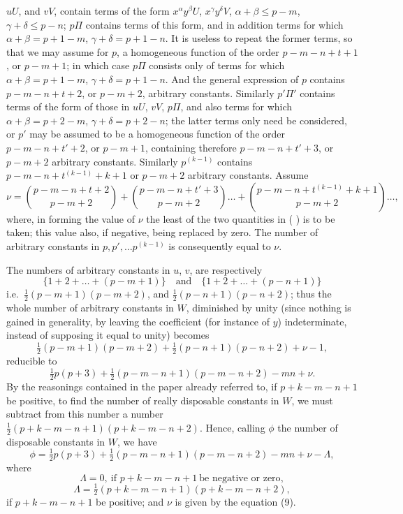 \documentclass[11pt]{article}
\begin{document}
$u U$, and $v V$, contain terms of the form $x^\alpha y^\beta U$, $x^\gamma y^\delta V$, $\alpha + \beta \leq p - m$, $\gamma + \delta \leq p - n$; $p\Pi$ contains terms of this form, and in addition terms for which $\alpha + \beta = p + 1 - m$, $\gamma + \delta = p + 1 - n$. It is useless to repeat the former terms, so that we may assume for $p$, a homogeneous function of the order $p - m - n + t + 1$, or $p - m + 1$; in which case $p\Pi$ consists only of terms for which $\alpha + \beta = p + 1 - m$, $\gamma + \delta = p + 1 - n$. And the general expression of $p$ contains $p - m - n + t + 2$, or $p - m + 2$, arbitrary constants. Similarly $p'\Pi'$ contains terms of the form of those in $u U$, $v V$, $p\Pi$, and also terms for which $\alpha + \beta = p + 2 - m$, $\gamma + \delta = p + 2 - n$; the latter terms only need be considered, or $p'$ may be assumed to be a homogeneous function of the order $p - m - n + t' + 2$, or $p - m + 1$, containing therefore $p - m - n + t' + 3$, or $p - m + 2$ arbitrary constants. Similarly $p^{(k-1)}$ contains $p - m - n + t^{(k-1)} + k + 1$ or $p - m + 2$ arbitrary constants. Assume
\[
\nu = \binom{p - m - n + t + 2}{p - m + 2} + \binom{p - m - n + t' + 3}{p - m + 2} \ldots + \binom{p - m - n + t^{(k-1)} + k + 1}{p - m + 2} \ldots \tag{10},
\]
where, in forming the value of $\nu$ the least of the two quantities in ( ) is to be taken; this value also, if negative, being replaced by zero. The number of arbitrary constants in $p, p', \ldots p^{(k-1)}$ is consequently equal to $\nu$.

The numbers of arbitrary constants in $u$, $v$, are respectively
\[
\{1 + 2 + \ldots + (p - m + 1)\}\quad\text{and}\quad\{1 + 2 + \ldots + (p - n + 1)\}
\]
i.e.\ $\tfrac12(p - m + 1)(p - m + 2)$, and $\tfrac12(p - n + 1)(p - n + 2)$;
thus the whole number of arbitrary constants in $W$, diminished by unity (since nothing is gained in generality, by leaving the coefficient (for instance of $y$) indeterminate, instead of supposing it equal to unity) becomes
\[
\tfrac12(p - m + 1)(p - m + 2) + \tfrac12(p - n + 1)(p - n + 2) + \nu - 1,
\]
reducible to
\[
\tfrac12 p(p + 3) + \tfrac12(p - m - n + 1)(p - m - n + 2) - mn + \nu.
\]
By the reasonings contained in the paper already referred to, if $p + k - m - n + 1$ be positive, to find the number of really disposable constants in $W$, we must subtract from this number a number $\tfrac12(p + k - m - n + 1)(p + k - m - n + 2)$. Hence, calling $\phi$ the number of disposable constants in $W$, we have
\[
\phi = \tfrac12 p(p + 3) + \tfrac12(p - m - n + 1)(p - m - n + 2) - mn + \nu - \Lambda \tag{11},
\]
where
\[
\Lambda = 0,\ \text{if } p + k - m - n + 1\ \text{be negative or zero} \tag{12},
\]
\[
\Lambda = \tfrac12(p + k - m - n + 1)(p + k - m - n + 2),
\]
if $p + k - m - n + 1$ be positive; and $\nu$ is given by the equation (9).
\end{document}
